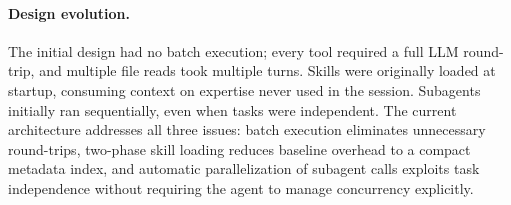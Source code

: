 \paragraph{Design evolution.} The initial design had no batch execution; every tool required a full LLM round-trip, and multiple file reads took multiple turns. Skills were originally loaded at startup, consuming context on expertise never used in the session. Subagents initially ran sequentially, even when tasks were independent. The current architecture addresses all three issues: batch execution eliminates unnecessary round-trips, two-phase skill loading reduces baseline overhead to a compact metadata index, and automatic parallelization of subagent calls exploits task independence without requiring the agent to manage concurrency explicitly.
